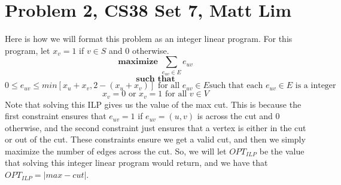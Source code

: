 \documentclass{article}
\begin{document}
\section*{Problem 2, CS38 Set 7, Matt Lim}
Here is how we will format this problem as an integer linear program. For this
program, let $x_v = 1$ if $v \in S$ and $0$ otherwise.
\[ \textbf{maximize } \sum_{e_{uv} \in E} e_{uv} \]
\[ \textbf{such that} \]
\[ 0 \leq e_{uv} \leq min[x_u + x_v, 2 - (x_u + x_v)] \text{ for all $e_{uv} \in E$
such that each $e_{uv} \in E$ is a integer} \]
\[ x_v = 0 \text{ or } x_v = 1 \text{ for all $v \in V$} \]
Note that solving this ILP gives us the value of the max cut. This is because
the first constraint ensures that $e_{uv} = 1$ if
$e_{uv} = (u,v)$ is across the cut and $0$ otherwise, and the second constraint
just ensures that a vertex is either in the cut or out of the cut. These
constraints ensure we get a valid cut, and then we simply maximize the number of
edges across the cut. So, we will let $OPT_{ILP}$ be the value that solving this
integer linear program would return, and we have that $OPT_{ILP} = |max-cut|$.
\end{document}
